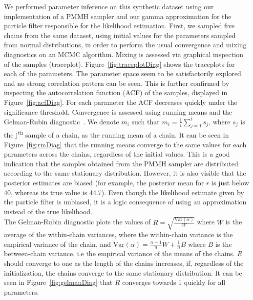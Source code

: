 \documentclass[12pt]{article}
\begin{document}
	We performed parameter inference on this synthetic dataset using our implementation of a PMMH sampler and our gamma approximation for the particle filter responsible for the likelihood estimation. First, we sampled five chains from the same dataset, using initial values for the parameters sampled from normal distributions,  in order to perform the usual convergence and mixing diagnostics on an MCMC algorithm. Mixing is assessed via graphical inspection of the samples (traceplot). Figure~\ref{fig:traceplotDiag} shows the traceplots for each of the parameters. The parameter space seem to be satisfactorily explored and no strong correlation pattern can be seen. This is further confirmed by inspecting the autocorrelation function (ACF) of the samples, displayed in Figure~\ref{fig:acfDiag}. For each parameter the ACF decreases quickly under the significance threshold. Convergence is assessed using running means and the Gelman-Rubin diagnostic~\cite{gelman1992inference}. We denote $m_i$ such that $m_i=\frac{1}{i}\sum_{j=1}^{i}s_j$, where $s_j$ is the j\textsuperscript{th} sample of a chain, as the running mean of a chain. It can be seen in Figure~\ref{fig:rmDiag} that the running means converge to the same values for each parameters across the chains, regardless of the initial values. This is a good indication that the samples obtained from the PMMH sampler are distributed according to the same stationary distribution. However, it is also visible that the posterior estimates are biased (for example, the posterior mean for $r$ is just below 40, whereas its true value is 44.7). Even though the likelihood estimate given by the particle filter is unbiased, it is a logic consequence of using an approximation instead of the true likelihood. \\
	The Gelman-Rubin diagnostic plots the values of $R = \sqrt{\frac{\mathrm{Var}(\alpha)}{W}}$ where $W$ is the average of the within-chain variances, where the within-chain variance is the empirical variance of the chain, and $ \mathrm{Var}(\alpha) = \frac{n-1}{n}W + \frac{1}{n}B$ where $B$ is the between-chain variance, i.e the empirical variance of the means of the chains. $R$ should converge to one as the length of the chains increases, if, regardless of the initialization, the chains converge to the same stationary distribution. It can be seen in Figure~\ref{fig:gelmanDiag} that $R$ converges towards 1 quickly for all parameters. 
	
\end{document}
